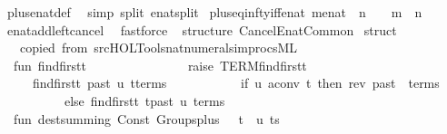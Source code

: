 \begin{isabellebody}
\ plus{\isacharunderscore}enat{\isacharunderscore}def\ \isamarkupfalse%
\ {\isacharparenleft}simp\ split{\isacharcolon}\ enat{\isachardot}split{\isacharparenright}%
\endisatagproof
{\isafoldproof}%
%
\isadelimproof
\isanewline
%
\endisadelimproof
\isanewline
{}\isamarkupfalse%
\ plus{\isacharunderscore}eq{\isacharunderscore}infty{\isacharunderscore}iff{\isacharunderscore}enat{\isacharcolon}\ {\isachardoublequoteopen}{\isacharparenleft}m{\isacharcolon}{\isacharcolon}enat{\isacharparenright}\ {\isacharplus}\ n\ {\isacharequal}\ {\isasyminfinity}\ {\isasymlongleftrightarrow}\ m{\isacharequal}{\isasyminfinity}\ {\isasymor}\ n{\isacharequal}{\isasyminfinity}{\isachardoublequoteclose}\isanewline
%
\isadelimproof
%
\endisadelimproof
%
\isatagproof
{}\isamarkupfalse%
\ enat{\isacharunderscore}add{\isacharunderscore}left{\isacharunderscore}cancel\ \isamarkupfalse%
\ fastforce%
\endisatagproof
{\isafoldproof}%
%
\isadelimproof
\isanewline
%
\endisadelimproof
%
\isadelimML
\isanewline
%
\endisadelimML
%
\isatagML
{}\isamarkupfalse%
\ {\isacartoucheopen}\isanewline
structure\ Cancel{\isacharunderscore}Enat{\isacharunderscore}Common\ {\isacharequal}\isanewline
struct\isanewline
\ \ {\isacharparenleft}{\isacharasterisk}\ copied\ from\ src{\isacharslash}HOL{\isacharslash}Tools{\isacharslash}nat{\isacharunderscore}numeral{\isacharunderscore}simprocs{\isachardot}ML\ {\isacharasterisk}{\isacharparenright}\isanewline
\ \ fun\ find{\isacharunderscore}first{\isacharunderscore}t\ {\isacharunderscore}\ \ \ \ {\isacharunderscore}\ {\isacharbrackleft}{\isacharbrackright}\ \ \ \ \ \ \ \ \ {\isacharequal}\ raise\ TERM{\isacharparenleft}{\isachardoublequote}find{\isacharunderscore}first{\isacharunderscore}t{\isachardoublequote}{\isacharcomma}\ {\isacharbrackleft}{\isacharbrackright}{\isacharparenright}\isanewline
\ \ \ \ {\isacharbar}\ find{\isacharunderscore}first{\isacharunderscore}t\ past\ u\ {\isacharparenleft}t{\isacharcolon}{\isacharcolon}terms{\isacharparenright}\ {\isacharequal}\isanewline
\ \ \ \ \ \ \ \ \ \ if\ u\ aconv\ t\ then\ {\isacharparenleft}rev\ past\ {\isacharat}\ terms{\isacharparenright}\isanewline
\ \ \ \ \ \ \ \ \ \ else\ find{\isacharunderscore}first{\isacharunderscore}t\ {\isacharparenleft}t{\isacharcolon}{\isacharcolon}past{\isacharparenright}\ u\ terms\isanewline
\isanewline
\ \ fun\ dest{\isacharunderscore}summing\ {\isacharparenleft}Const\ {\isacharparenleft}\isactrlconstUNDERSCOREname {\isasymopen}Groups{\isachardot}plus{\isasymclose}{\isacharcomma}\ {\isacharunderscore}{\isacharparenright}\ {\isachardollar}\ t\ {\isachardollar}\ u{\isacharcomma}\ ts{\isacharparenright}\ {\isacharequal}\isanewline

\end{isabellebody}

